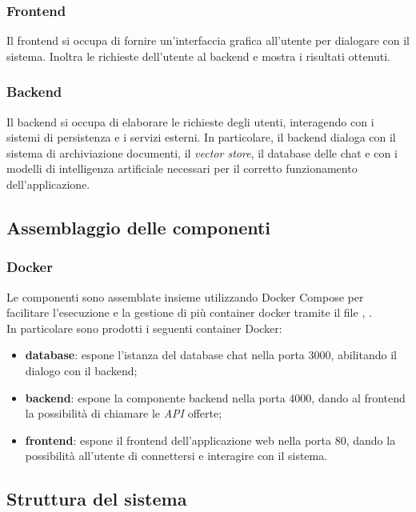 \documentclass[10pt, a4paper]{article}
\begin{document}
\subsubsection{Frontend}
Il frontend si occupa di fornire un'interfaccia grafica all'utente per dialogare con il sistema. Inoltra le richieste dell'utente al backend e mostra i risultati ottenuti.


\subsubsection{Backend}
Il backend si occupa di elaborare le richieste degli utenti, interagendo con i sistemi di persistenza e i servizi esterni.
In particolare, il backend dialoga con il sistema di archiviazione documenti, il \textit{vector store\pg}, il database delle chat e con i modelli di intelligenza artificiale necessari per il corretto funzionamento dell'applicazione.


\subsection{Assemblaggio delle componenti}
\subsubsection{Docker}
Le componenti sono assemblate insieme utilizzando Docker Compose per facilitare l'esecuzione e la gestione di più container docker tramite il file , .\\ %
In particolare sono prodotti i seguenti container Docker:
\begin{itemize}
    \item \textbf{database}: espone l'istanza del database chat nella porta 3000, abilitando il dialogo con il backend;
    \item \textbf{backend}: espone la componente backend nella porta 4000, dando al frontend la possibilità di chiamare le \textit{API\pg} offerte;
    \item \textbf{frontend}: espone il frontend dell'applicazione web nella porta 80, dando la possibilità all'utente di connettersi e interagire con il sistema.
\end{itemize}

\subsection{Struttura del sistema}
\end{document}
